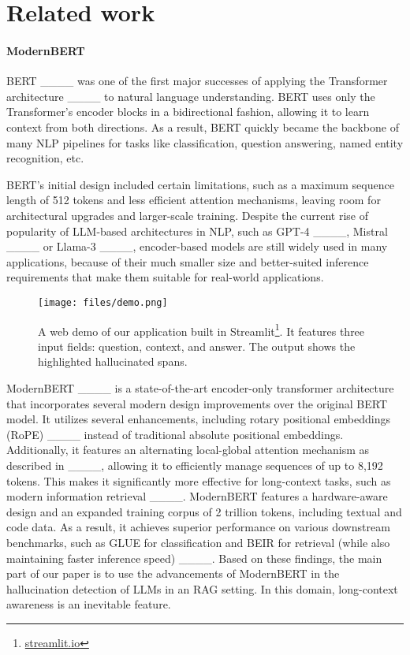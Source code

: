 \section{Related work}
\label{sec:rel}

\paragraph{ModernBERT}

BERT ____ was one of the first major successes of applying the Transformer
architecture ____ to natural language understanding. BERT uses only the Transformer's
encoder blocks in a bidirectional fashion, allowing it to learn context from both directions. As a result, BERT quickly
became the backbone of many NLP pipelines for tasks like classification, question answering, named entity recognition, etc.

BERT's initial design included certain limitations, such as a maximum sequence length of 512 tokens and less efficient attention mechanisms, leaving
room for architectural upgrades and larger-scale training. Despite the current rise of popularity of LLM-based architectures in NLP, such as GPT-4 ____, Mistral ____ or Llama-3 ____, encoder-based models are still widely used in many applications, because of their much smaller size and better-suited inference requirements that make them suitable for real-world applications.

\begin{figure}[ht]
    \centering
    \texttt{[image: files/demo.png]}
    \caption{A web demo of our application built in Streamlit\footnote{\url{streamlit.io}}. It features three input fields: question, context, and answer. The output shows the highlighted hallucinated spans.}
    \label{fig:demo}
\end{figure}

ModernBERT ____ is a state-of-the-art encoder-only transformer architecture that incorporates several
modern design improvements over the original BERT model. It utilizes several enhancements, including rotary positional embeddings (RoPE) ____ instead of traditional absolute positional embeddings. Additionally, it features an alternating local-global attention mechanism as described in ____, allowing it to efficiently manage sequences of up to 8,192 tokens. This makes it significantly more effective for long-context tasks, such as modern information retrieval ____. ModernBERT features a hardware-aware design and an expanded training corpus of 2 trillion tokens, including textual and code data. As a result, it achieves superior performance on various downstream benchmarks, such as GLUE for classification and BEIR for retrieval (while also maintaining faster inference speed) ____. Based on these findings, the main part of our paper is to use the advancements of ModernBERT in the hallucination detection of LLMs in an RAG setting. In this domain, long-context awareness is an inevitable feature.


